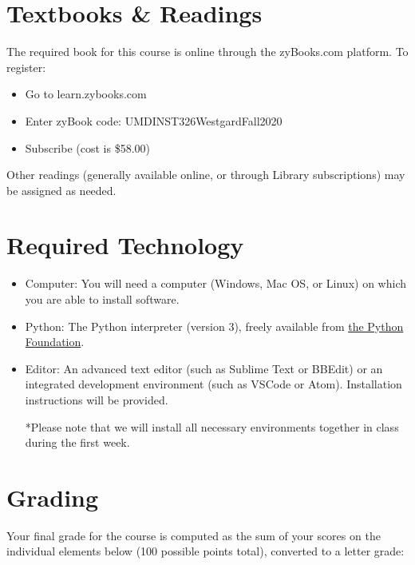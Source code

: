 \documentclass[11pt]{article}
\begin{document}
\section{Textbooks \& Readings}
The required book for this course is online through the zyBooks.com platform. To register: 
\begin{itemize}
	\item Go to learn.zybooks.com
	\item Enter zyBook code: UMDINST326WestgardFall2020
	\item Subscribe (cost is \$58.00)
\end{itemize}

Other readings (generally available online, or through Library subscriptions) may be assigned as needed.

\section{Required Technology}
\begin{itemize}
	\item Computer: You will need a computer (Windows, Mac OS, or Linux) on which you are able to install software.
	\item Python: The Python interpreter (version 3), freely available from \href{https://www.python.org/downloads}{the Python Foundation}.
	\item Editor: An advanced text editor (such as Sublime Text or BBEdit) or an integrated development environment (such as VSCode or Atom). Installation instructions will be provided.

*Please note that we will install all necessary environments together in class during the first week.
\end{itemize}

\section{Grading}
Your final grade for the course is computed as the sum of your scores on the individual elements below (100 possible points total), converted to a letter grade:
\end{document}
